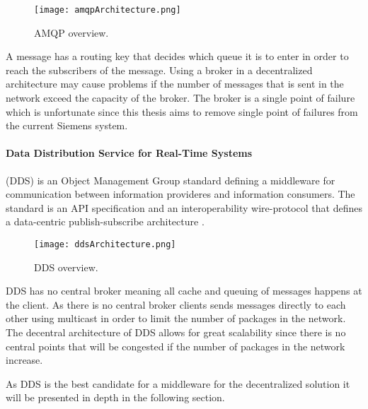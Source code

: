 \begin{figure}[!h]
	\centering
	\texttt{[image: amqpArchitecture.png]} 
	\caption[JMS overview]{
		\label{fig:amqpOverview} 
		\footnotesize{%
			AMQP overview.
		}
	}
\end{figure}

A message has a routing key that decides which queue it is to enter in order to reach the subscribers of the message. Using a broker in a decentralized architecture may cause problems if the number of messages that is sent in the network exceed the capacity of the broker.
The broker is a single point of failure which is unfortunate since this thesis aims to remove single point of failures from the current Siemens system.

\paragraph{Data Distribution Service for Real-Time Systems} (DDS) is an Object Management Group standard defining a middleware for communication between information provideres and information consumers.
The standard is an API specification and an interoperability wire-protocol that defines a data-centric publish-subscribe architecture \cite{pardo2003omg}.

\begin{figure}[!h]
	\centering
	\texttt{[image: ddsArchitecture.png]} 
	\caption[JMS overview]{
		\label{fig:ddsOverview} 
		\footnotesize{%
			DDS overview.
		}
	}
\end{figure}

DDS has no central broker meaning all cache and queuing of messages happens at the client. As there is no central broker clients sends messages directly to each other using multicast in order to limit the number of packages in the network. The decentral architecture of DDS allows for great scalability since there is no central points that will be congested if the number of packages in the network increase.

As DDS is the best candidate for a middleware for the decentralized solution it will be presented in depth in the following section.

